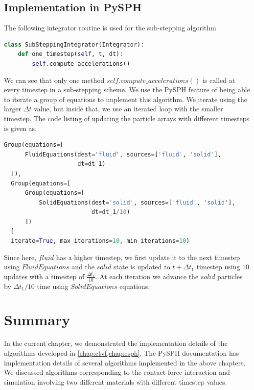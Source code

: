\subsection{Implementation in PySPH}
\label{sec:pysph-substepping-algorithm}
The following integrator routine is used for the sub-stepping algorithm
\lstset{basicstyle=\footnotesize\ttfamily}
\begin{lstlisting}[label={contact:equations},frame=lines,language=Python,upquote=True]
class SubSteppingIntegrator(Integrator):
    def one_timestep(self, t, dt):
        self.compute_accelerations()
\end{lstlisting}
We can see that only one method $self.compute\_accelerations()$ is
called at every timestep in a sub-stepping scheme. We use the PySPH feature of
being able to iterate a group of equations to implement this algorithm. We
iterate using the larger $\Delta t$ value, but inside that, we use an iterated
loop with the smaller timestep. The code listing of updating the particle
arrays with different timesteps is given as,
\lstset{basicstyle=\footnotesize\ttfamily}
\begin{lstlisting}[label={contact:equations},frame=lines,language=Python,upquote=True]
  Group(equations=[
      FluidEquations(dest='fluid', sources=['fluid', 'solid'],
                     dt=dt_1)
  ]),
  Group(equations=[
      Group(equations=[
          SolidEquations(dest='solid', sources=['fluid', 'solid'],
                         dt=dt_1/10)
      ])
  ]
  iterate=True, max_iterations=10, min_iterations=10)
\end{lstlisting}
Since here, $fluid$ has a higher timestep, we first update it to the next
timestep using $FluidEquations$ and the $solid$ state is updated to $t + \Delta t_1$
timestep using $10$ updates with a timestep of $\frac{\Delta t_1}{10}$. At each
iteration we advance the $solid$ particles by $\Delta t_1 / 10$ time using
$SolidEquations$ equations.


\FloatBarrier%
\section{Summary}
\label{sec:id:summary}
In the current chapter, we demonstrated the implementation details of the
algorithms developed in \cref{chap:ctvf,chap:csph}. The PySPH documentation has
implementation details of several algorithms implemented in the above chapters.
We discussed algorithms corresponding to the contact force interaction and
simulation involving two different materials with different timestep values.

